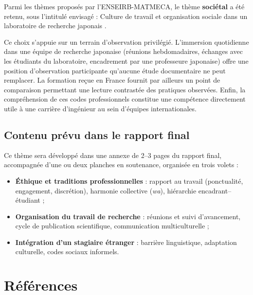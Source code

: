 \documentclass[11pt, a4paper]{article}
\begin{document}
Parmi les thèmes proposés par l'ENSEIRB-MATMECA, le thème \textbf{sociétal} a
été retenu, sous l'intitulé envisagé : \og Culture de travail et organisation
sociale dans un laboratoire de recherche japonais \fg.

Ce choix s'appuie sur un terrain d'observation privilégié. L'immersion
quotidienne dans une équipe de recherche japonaise (réunions hebdomadaires,
échanges avec les étudiants du laboratoire, encadrement par une professeure
japonaise) offre une position d'observation participante qu'aucune étude
documentaire ne peut remplacer. La formation
reçue en France fournit par ailleurs un point de comparaison permettant une
lecture contrastée des pratiques observées. Enfin, la compréhension de ces
codes professionnels constitue une compétence directement utile à une
carrière d'ingénieur au sein d'équipes internationales.

\subsection{Contenu prévu dans le rapport final}

Ce thème sera développé dans une annexe de 2--3 pages du rapport final,
accompagnée d'une ou deux planches en soutenance, organisée en trois volets :

\begin{itemize}[nosep]
  \item \textbf{Éthique et traditions professionnelles} : rapport au travail
        (ponctualité, engagement, discrétion), harmonie collective
        (\textit{wa}), hiérarchie encadrant--étudiant ;
  \item \textbf{Organisation du travail de recherche} : réunions et suivi
        d'avancement, cycle de publication scientifique, communication
        multiculturelle ;
  \item \textbf{Intégration d'un stagiaire étranger} : barrière linguistique,
        adaptation culturelle, codes sociaux informels.
\end{itemize}

\section*{Références}
\end{document}
